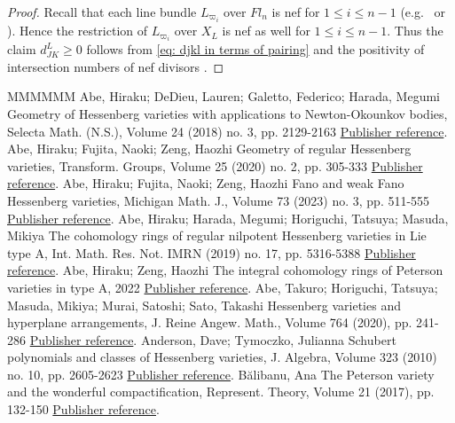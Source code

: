 \documentclass[11pt]{article}
\theoremstyle{definition}
\numberwithin{equation}{section}
\numberwithin{equation}{section}
\begin{document}
\begin{proof}
Recall that each line bundle $L_{\varpi_i}$ over $Fl_n$ is nef for $1\le i\le n-1$ (e.g.\ \cite[proof of Proposition 1.4.1]{Bri} or \cite[Lemma 3.5]{ab-fu-ze2}). Hence the restriction of $L_{\varpi_i}$ over $X_L$ is nef as well for $1\le i\le n-1$. Thus the claim $d_{JK}^L \ge 0$ follows from \eqref{eq: djkl in terms of pairing} and the positivity of intersection numbers of nef divisors \cite[Example 1.4.16]{Lazarsfeld}.
\end{proof}
\begin{thebibliography}{MMMMMM}
 Abe, Hiraku; DeDieu, Lauren; Galetto, Federico; Harada, Megumi Geometry of Hessenberg varieties with applications to Newton-Okounkov bodies, Selecta Math. (N.S.), Volume 24 (2018) no. 3, pp. 2129-2163 \href{https://alco.centre-mersenne.org/articles/10.5802/alco.342/#ab-de-ga-ha}{Publisher reference}.
 Abe, Hiraku; Fujita, Naoki; Zeng, Haozhi Geometry of regular Hessenberg varieties, Transform. Groups, Volume 25 (2020) no. 2, pp. 305-333 \href{https://alco.centre-mersenne.org/articles/10.5802/alco.342/#ab-fu-ze}{Publisher reference}.
 Abe, Hiraku; Fujita, Naoki; Zeng, Haozhi Fano and weak Fano Hessenberg varieties, Michigan Math. J., Volume 73 (2023) no. 3, pp. 511-555 \href{https://alco.centre-mersenne.org/articles/10.5802/alco.342/#ab-fu-ze2}{Publisher reference}.
 Abe, Hiraku; Harada, Megumi; Horiguchi, Tatsuya; Masuda, Mikiya The cohomology rings of regular nilpotent Hessenberg varieties in Lie type A, Int. Math. Res. Not. IMRN (2019) no. 17, pp. 5316-5388 \href{https://alco.centre-mersenne.org/articles/10.5802/alco.342/#AHHM}{Publisher reference}.
 Abe, Hiraku; Zeng, Haozhi The integral cohomology rings of Peterson varieties in type A, 2022 \href{https://alco.centre-mersenne.org/articles/10.5802/alco.342/#AZ}{Publisher reference}.
 Abe, Takuro; Horiguchi, Tatsuya; Masuda, Mikiya; Murai, Satoshi; Sato, Takashi Hessenberg varieties and hyperplane arrangements, J. Reine Angew. Math., Volume 764 (2020), pp. 241-286 \href{https://alco.centre-mersenne.org/articles/10.5802/alco.342/#AHMMS}{Publisher reference}.
 Anderson, Dave; Tymoczko, Julianna Schubert polynomials and classes of Hessenberg varieties, J. Algebra, Volume 323 (2010) no. 10, pp. 2605-2623 \href{https://alco.centre-mersenne.org/articles/10.5802/alco.342/#an-ty}{Publisher reference}.
 Bălibanu, Ana The Peterson variety and the wonderful compactification, Represent. Theory, Volume 21 (2017), pp. 132-150 \href{https://alco.centre-mersenne.org/articles/10.5802/alco.342/#Ba}{Publisher reference}.

\end{thebibliography}
\end{document}
